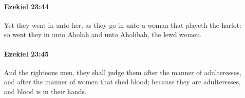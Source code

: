 		\paragraph{Ezekiel 23:44} %
			\label{EZEKIEL-23-44}

			Yet they went in unto her, as they go in unto a woman that playeth the harlot: so went they in unto Aholah and unto Aholibah, the lewd women.


		\paragraph{Ezekiel 23:45} %
			\label{EZEKIEL-23-45}

			And the righteous men, they shall judge them after the manner of adulteresses, and after the manner of women that shed blood; because they are adulteresses, and blood is in their hands.


